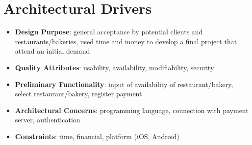 \documentclass[pdftex, a4paper]{scrartcl}
\begin{document}
\section{Architectural Drivers}

\begin{itemize}
    \item \textbf{Design Purpose}: general acceptance by potential clients and restaurants/bakeries, used
    time and money to develop a final project that attend an initial demand
    \item \textbf{Quality Attributes}: usability, availability, modifiability, security
    \item \textbf{Preliminary Functionality}: input of availability of restaurant/bakery, select restaurant/bakery, 
    register payment
    \item \textbf{Architectural Concerns}: programming language, connection with payment server, authentication
    \item \textbf{Constraints}: time, financial, platform (iOS, Android)
\end{itemize}
\end{document}
